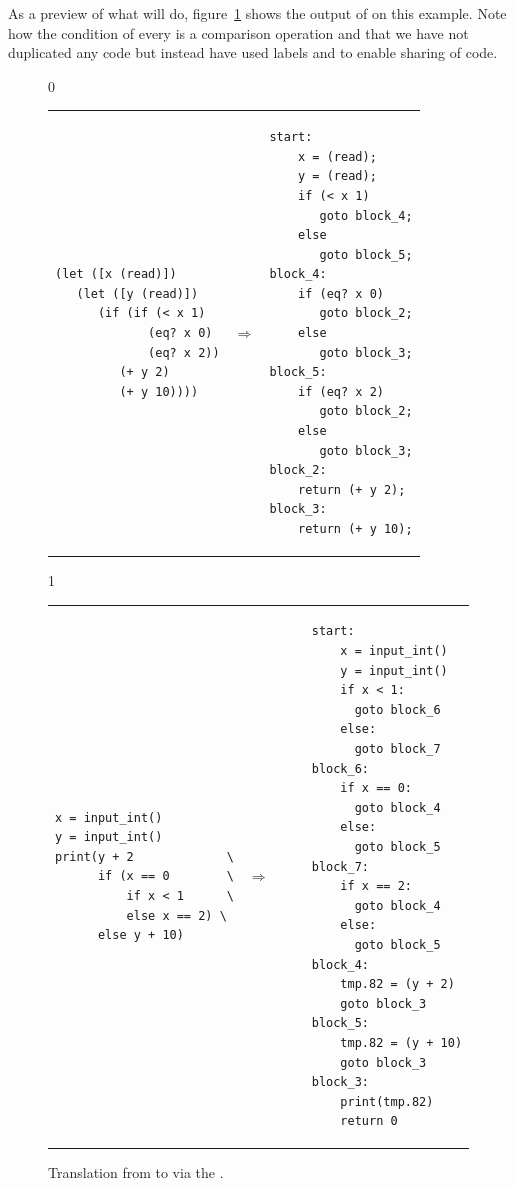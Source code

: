 \documentclass[7x10]{TimesAPriori_MIT}%
\def\racketEd{0}
\def\pythonEd{1}
\def\edition{1}
\newcommand{\pythonColor}[0]{}
\numberwithin{theorem}{chapter}
\numberwithin{definition}{chapter}
\numberwithin{equation}{chapter}
\begin{document}
As a preview of what  will do,
figure~\ref{fig:explicate-control-s1-38} shows the output of
 on this example. Note how the condition of
every  is a comparison operation and that we have not
duplicated any code but instead have used labels and  to
enable sharing of code.

\begin{figure}[tbp]
\begin{tcolorbox}[colback=white]
{\if\edition\racketEd        
\begin{tabular}{lll}
\begin{minipage}{0.4\textwidth}
\begin{lstlisting}
(let ([x (read)])
   (let ([y (read)])
      (if (if (< x 1)
             (eq? x 0)
             (eq? x 2))
         (+ y 2)
         (+ y 10))))
\end{lstlisting}
\end{minipage}
&
$\Rightarrow$
&
\begin{minipage}{0.55\textwidth}
\begin{lstlisting}
start:
    x = (read);
    y = (read);
    if (< x 1)
       goto block_4;
    else
       goto block_5;
block_4:
    if (eq? x 0)
       goto block_2;
    else
       goto block_3;
block_5:
    if (eq? x 2)
       goto block_2;
    else
       goto block_3;
block_2:
    return (+ y 2);
block_3:
    return (+ y 10);
\end{lstlisting}
\end{minipage}
\end{tabular} 
\fi}
{\if\edition\pythonEd\pythonColor
\begin{tabular}{lll}
\begin{minipage}{0.4\textwidth}
\begin{lstlisting}
x = input_int()
y = input_int()
print(y + 2             \
      if (x == 0        \
          if x < 1      \
          else x == 2) \
      else y + 10)
\end{lstlisting}
\end{minipage}
&
$\Rightarrow\qquad$
&
\begin{minipage}{0.55\textwidth}
\begin{lstlisting}
start:
    x = input_int()
    y = input_int()
    if x < 1:
      goto block_6
    else:
      goto block_7
block_6:
    if x == 0:
      goto block_4
    else:
      goto block_5
block_7:
    if x == 2:
      goto block_4
    else:
      goto block_5
block_4:
    tmp.82 = (y + 2)
    goto block_3
block_5:
    tmp.82 = (y + 10)
    goto block_3
block_3:
    print(tmp.82)
    return 0
\end{lstlisting}
\end{minipage}
\end{tabular} 
\fi}
\end{tcolorbox}
\caption{Translation from \LangIf{} to \LangCIf{}
  via the .}
\label{fig:explicate-control-s1-38}
\end{figure}
\end{document}
